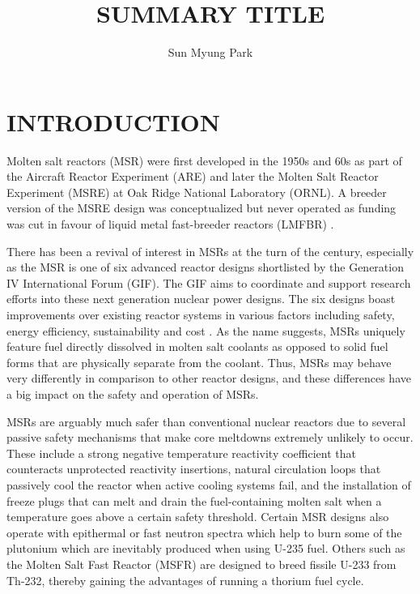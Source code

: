 \documentclass[letterpaper]{mandc2019}
\begin{document}
\title{SUMMARY TITLE}
\author{Sun Myung Park}

\maketitle
\justify

\section{INTRODUCTION}

Molten salt reactors (MSR) were first developed in the 1950s and 60s as part of the Aircraft Reactor Experiment (ARE) and later the Molten Salt Reactor Experiment (MSRE) at Oak Ridge National Laboratory (ORNL). A breeder version of the MSRE design was conceptualized but never operated as funding was cut in favour of liquid metal fast-breeder reactors (LMFBR) \cite{macpherson_molten_1985}.

There has been a revival of interest in MSRs at the turn of the century, especially as the MSR is one of six advanced reactor designs shortlisted by the Generation IV International Forum (GIF). The GIF aims to coordinate and support research efforts into these next generation nuclear power designs. The six designs boast improvements over existing reactor systems in various factors including safety, energy efficiency, sustainability and cost \cite{doe_technology_2002}. As the name suggests, MSRs uniquely feature fuel directly dissolved in molten salt coolants as opposed to solid fuel forms that are physically separate from the coolant. Thus, MSRs may behave very differently in comparison to other reactor designs, and these differences have a big impact on the safety and operation of MSRs.

MSRs are arguably much safer than conventional nuclear reactors due to several passive safety mechanisms that make core meltdowns extremely unlikely to occur. These include a strong negative temperature reactivity coefficient that counteracts unprotected reactivity insertions, natural circulation loops that passively cool the reactor when active cooling systems fail, and the installation of freeze plugs that can melt and drain the fuel-containing molten salt when a temperature goes above a certain safety threshold. Certain MSR designs also operate with epithermal or fast neutron spectra which help to burn some of the plutonium which are inevitably produced when using U-235 fuel. Others such as the Molten Salt Fast Reactor (MSFR) are designed to breed fissile U-233 from Th-232, thereby gaining the advantages of running a thorium fuel cycle. 
\end{document}
